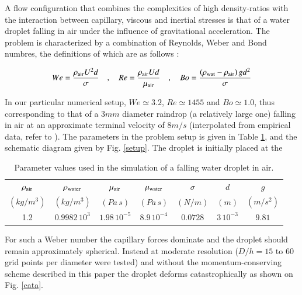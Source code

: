 A flow configuration that combines the complexities of high density-ratios with the interaction between capillary, viscous and inertial stresses is that of a water droplet falling in air under the influence of gravitational acceleration. The problem is characterized by a combination of Reynolds, Weber and Bond numbres, the definitions of which are as follows : 

\begin{align}
We=\frac{\rho_{\rm air} U^2 d}{\sigma} \quad,\quad Re= \frac{\rho_{\rm air} U d}{\mu_{\rm air}} \quad,\quad Bo=\frac{\left(\rho_{\rm wat}-\rho_{\rm air}\right) g d^2 }{\sigma}
\end{align}

In our particular numerical setup, $We \simeq 3.2 $, $Re \simeq 1455 $ and $Bo \simeq 1.0 $, thus corresponding to that of a $3mm$ diameter raindrop (a relatively large one) falling in air at an approximate terminal velocity of  $8 m/s$ (interpolated from empirical data, refer to  \cite{gunn1949terminal}). The parameters in the problem setup is given in Table \ref{raindropprop}, and the schematic diagram given by Fig. \ref{setup}. The droplet is initially placed at the  
\begin{table}
\begin{center}
\begin{tabular}{ccccccc}
\hline\hline
$\rho_{\rm air}$ & $\rho_{\rm water}$ & $\mu_{\rm air}$ 
& $\mu_{\rm water}$ & $\sigma$ & $d$ & $g$\\
$\left(kg/m^3\right)$ & $\left(kg/m^3\right)$ & $\left(Pa \, s\right)$ 
& $\left(Pa \,s \right)$ & $\left(N/m\right)$ & $(m)$ & $(m /s^{2})$ \\
\hline
1.2 & $0.9982\, 10^3$ & $1.98\,10^{-5}$ & 
$8.9 \, 10^{-4}$ & $0.0728$ & $3\, 10^{-3}$ & $9.81$\\
\hline\hline
\end{tabular}
\caption{Parameter values used in the simulation of a falling water droplet in air. \label{raindropprop}}
\end{center}
\end{table}
For such a Weber number the capillary forces dominate and the droplet should 
remain approximately spherical. Instead at moderate resolution ($D/h=15$ to 
60 grid points per diameter were tested) and without the momentum-conserving 
scheme described in this paper the droplet deforms catastrophically
as shown on Fig. \ref{cata}. 

